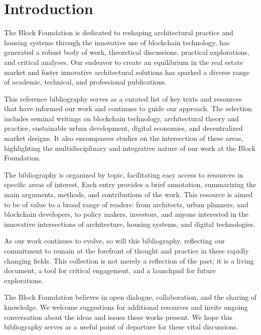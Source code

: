 \section{Introduction}


The Block Foundation is dedicated to reshaping architectural practice and housing systems through the innovative use of blockchain technology, has generated a robust body of work, theoretical discussions, practical explorations, and critical analyses. Our endeavor to create an equilibrium in the real estate market and foster innovative architectural solutions has sparked a diverse range of academic, technical, and professional publications.

This reference bibliography serves as a curated list of key texts and resources that have informed our work and continues to guide our approach. The selection includes seminal writings on blockchain technology, architectural theory and practice, sustainable urban development, digital economies, and decentralized market designs. It also encompasses studies on the intersection of these areas, highlighting the multidisciplinary and integrative nature of our work at the Block Foundation.

The bibliography is organized by topic, facilitating easy access to resources in specific areas of interest. Each entry provides a brief annotation, summarizing the main arguments, methods, and contributions of the work. This resource is aimed to be of value to a broad range of readers: from architects, urban planners, and blockchain developers, to policy makers, investors, and anyone interested in the innovative intersections of architecture, housing systems, and digital technologies.

As our work continues to evolve, so will this bibliography, reflecting our commitment to remain at the forefront of thought and practice in these rapidly changing fields. This collection is not merely a reflection of the past; it is a living document, a tool for critical engagement, and a launchpad for future explorations.

The Block Foundation believes in open dialogue, collaboration, and the sharing of knowledge. We welcome suggestions for additional resources and invite ongoing conversation about the ideas and issues these works present. We hope this bibliography serves as a useful point of departure for these vital discussions.
